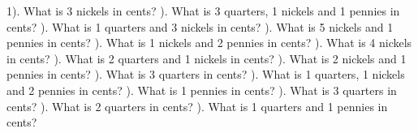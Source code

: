 \documentclass{article}%
\begin{document}
1). What is 3 nickels in cents?%
\newline%
\newline%
). What is 3 quarters, 1 nickels and 1 pennies in cents?%
\newline%
\newline%
). What is 1 quarters and 3 nickels in cents?%
\newline%
\newline%
). What is 5 nickels and 1 pennies in cents?%
\newline%
\newline%
). What is 1 nickels and 2 pennies in cents?%
\newline%
\newline%
). What is 4 nickels in cents?%
\newline%
\newline%
). What is 2 quarters and 1 nickels in cents?%
\newline%
\newline%
). What is 2 nickels and 1 pennies in cents?%
\newline%
\newline%
). What is 3 quarters in cents?%
\newline%
\newline%
). What is 1 quarters, 1 nickels and 2 pennies in cents?%
\newline%
\newline%
). What is 1 pennies in cents?%
\newline%
\newline%
). What is 3 quarters in cents?%
\newline%
\newline%
). What is 2 quarters in cents?%
\newline%
\newline%
). What is 1 quarters and 1 pennies in cents?%
\newline%
\end{document}
